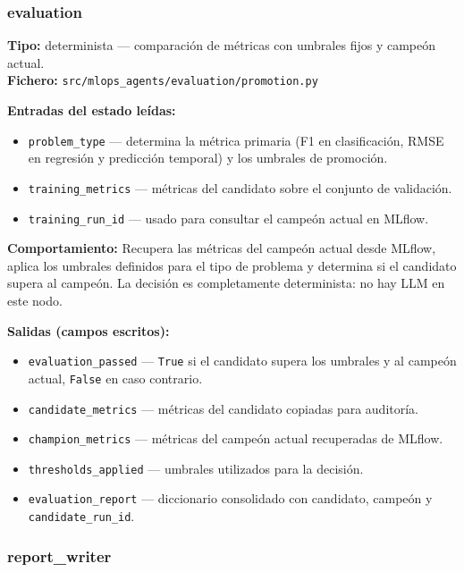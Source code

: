 \subsubsection*{evaluation}
\label{sec:nodo-evaluation}

\textbf{Tipo:} determinista --- comparación de métricas con umbrales fijos y campeón actual.\\
\textbf{Fichero:} \texttt{src/mlops\_agents/evaluation/promotion.py}

\textbf{Entradas del estado leídas:}
\begin{itemize}
  \item \texttt{problem\_type} — determina la métrica primaria (F1 en clasificación, RMSE en regresión y predicción temporal) y los umbrales de promoción.
  \item \texttt{training\_metrics} — métricas del candidato sobre el conjunto de validación.
  \item \texttt{training\_run\_id} — usado para consultar el campeón actual en MLflow.
\end{itemize}

\textbf{Comportamiento:} Recupera las métricas del campeón actual desde MLflow, aplica los umbrales definidos para el tipo de problema y determina si el candidato supera al campeón. La decisión es completamente determinista: no hay LLM en este nodo.

\textbf{Salidas (campos escritos):}
\begin{itemize}
  \item \texttt{evaluation\_passed} — \texttt{True} si el candidato supera los umbrales y al campeón actual, \texttt{False} en caso contrario.
  \item \texttt{candidate\_metrics} — métricas del candidato copiadas para auditoría.
  \item \texttt{champion\_metrics} — métricas del campeón actual recuperadas de MLflow.
  \item \texttt{thresholds\_applied} — umbrales utilizados para la decisión.
  \item \texttt{evaluation\_report} — diccionario consolidado con candidato, campeón y \texttt{candidate\_run\_id}.
\end{itemize}

\subsubsection*{report\_writer}
\label{sec:nodo-report-writer}

